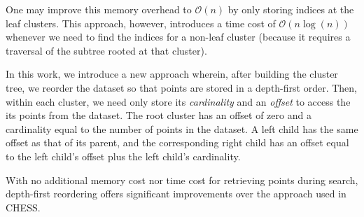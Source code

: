 One may improve this memory overhead to $\mathcal{O}(n)$ by only storing indices at the leaf clusters.
This approach, however, introduces a time cost of $\mathcal{O}(n\log(n))$ whenever we need to find the indices for a non-leaf cluster (because it requires a traversal of the subtree rooted at that cluster).

In this work, we introduce a new approach wherein, after building the cluster tree, we reorder the dataset so that points are stored in a depth-first order.
Then, within each cluster, we need only store its \emph{cardinality} and an \emph{offset} to access the its points from the dataset.
The root cluster has an offset of zero and a cardinality equal to the number of points in the dataset.
A left child has the same offset as that of its parent, and the corresponding right child has an offset equal to the left child's offset plus the left child's cardinality.

With no additional memory cost nor time cost for retrieving points during search, depth-first reordering offers significant improvements over the approach used in CHESS.





